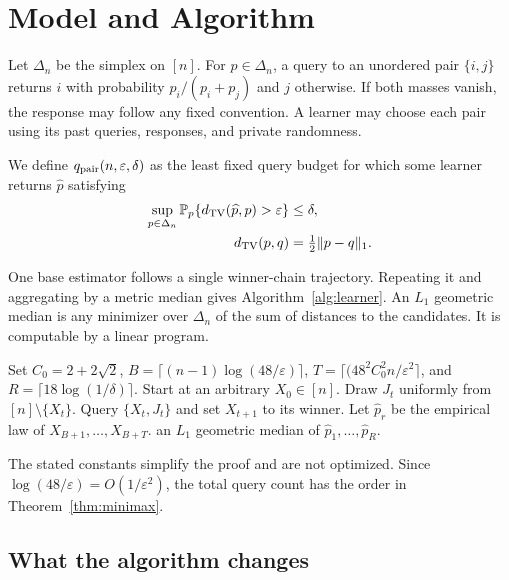 \documentclass[twoside]{article}
\newcommand{\Prb}{\mathbb P}
\newcommand{\TV}{d_{\rm TV}}
\begin{document}
\section{Model and Algorithm}
\label{sec:model}

Let $\Delta_n$ be the simplex on $[n]$. For $p\in\Delta_n$, a query to an unordered pair $\{i,j\}$ returns $i$ with probability $p_i/(p_i+p_j)$ and $j$ otherwise. If both masses vanish, the response may follow any fixed convention. A learner may choose each pair using its past queries, responses, and private randomness.

We define $q_{\rm pair}(n,\varepsilon,\delta)$ as the least fixed query budget for which some learner returns $\widehat p$ satisfying
\begin{align*}
 \sup_{p\in\Delta_n}
 \Prb_p\{\TV(\widehat p,p)>\varepsilon\}&\le\delta,\\
 \TV(p,q)&=\tfrac12\|p-q\|_1.
\end{align*}

One base estimator follows a single winner-chain trajectory. Repeating it and aggregating by a metric median gives Algorithm~\ref{alg:learner}. An $L_1$ geometric median is any minimizer over $\Delta_n$ of the sum of distances to the candidates. It is computable by a linear program.

\begin{algorithm}[t]
\caption{High-confidence pairwise learner}
\label{alg:learner}
\begin{algorithmic}[1]
\STATE Set $C_0=2+2\sqrt2$,
$B=\lceil(n-1)\log(48/\varepsilon)\rceil$,
$T=\lceil(48^2C_0^2n/\varepsilon^2\rceil$, and
$R=\lceil18\log(1/\delta)\rceil$.
  \STATE Start at an arbitrary $X_0\in[n]$.
    \STATE Draw $J_t$ uniformly from $[n]\setminus\{X_t\}$.
    \STATE Query $\{X_t,J_t\}$ and set $X_{t+1}$ to its winner.
  \ENDFOR
  \STATE Let $\widehat p_r$ be the empirical law of
  $X_{B+1},\ldots,X_{B+T}$.
\ENDFOR
\RETURN an $L_1$ geometric median of $\widehat p_1,\ldots,\widehat p_R$.
\end{algorithmic}
\end{algorithm}

The stated constants simplify the proof and are not optimized. Since $\log(48/\varepsilon)=O(1/\varepsilon^2)$, the total query count has the order in Theorem~\ref{thm:minimax}.

\subsection{What the algorithm changes}
\label{sec:algorithm-comparison}
\end{document}
